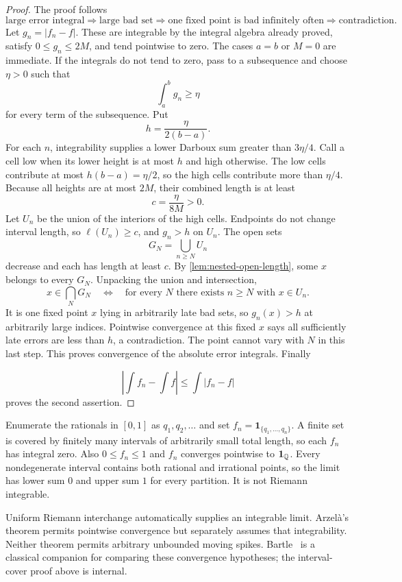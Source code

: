 \begin{proof}
The proof follows
\[
\boxed{\text{large error integral}\Rightarrow\text{large bad set}
\Rightarrow\text{one fixed point is bad infinitely often}
\Rightarrow\text{contradiction}.}
\]
Let $g_n=|f_n-f|$. These are integrable by the integral algebra already
proved, satisfy $0\leq g_n\leq2M$, and tend pointwise to zero.
The cases $a=b$ or $M=0$ are immediate. If the integrals do not tend to
zero, pass to a subsequence and choose $\eta>0$ such that
\[
\int_a^b g_n\geq\eta
\]
for every term of the subsequence. Put
\[
h=\frac{\eta}{2(b-a)}.
\]
For each $n$, integrability supplies a lower Darboux sum greater than
$3\eta/4$. Call a cell low when its lower height is at most $h$ and high
otherwise. The low cells contribute at most $h(b-a)=\eta/2$, so the high
cells contribute more than $\eta/4$. Because all heights are at most
$2M$, their combined length is at least
\[
c=\frac{\eta}{8M}>0.
\]
Let $U_n$ be the union of the interiors of the high cells. Endpoints do not
change interval length, so $\ell(U_n)\geq c$, and $g_n>h$ on $U_n$.
The open sets
\[
G_N=\bigcup_{n\geq N}U_n
\]
decrease and each has length at least $c$. By
\cref{lem:nested-open-length}, some
$x$ belongs to every $G_N$. Unpacking the union and intersection,
\[
x\in\bigcap_NG_N\quad\Longleftrightarrow\quad
\text{for every }N\text{ there exists }n\geq N\text{ with }x\in U_n.
\]
It is one fixed point $x$ lying in arbitrarily late bad sets, so
$g_n(x)>h$ at arbitrarily large indices. Pointwise convergence at this
fixed $x$ says all sufficiently late errors are less than $h$, a
contradiction. The point cannot vary with $N$ in this last step. This proves convergence of the absolute
error integrals. Finally

\[
|\int f_n-\int f|\leq\int|f_n-f|
\]
 proves the second assertion.
\end{proof}
\begin{example}
Enumerate the rationals in $[0,1]$ as $q_1,q_2,\ldots$ and set
$f_n=\mathbf1_{\{q_1,\ldots,q_n\}}$. A finite set is covered by
finitely many intervals of arbitrarily small total length, so each
$f_n$ has integral zero. Also $0\leq f_n\leq1$ and $f_n$ converges
pointwise to $\mathbf1_{\mathbb{Q}}$. Every nondegenerate interval contains both
rational and irrational points, so the limit has lower sum $0$ and upper
sum $1$ for every partition. It is not Riemann integrable.
\end{example}
Uniform Riemann interchange automatically supplies an integrable limit.
Arzel\`a's theorem permits pointwise convergence but separately assumes
that integrability. Neither theorem permits arbitrary unbounded moving
spikes. Bartle~\cite{bartle-elements} is a classical companion for comparing
these convergence hypotheses; the interval-cover proof above is internal.

